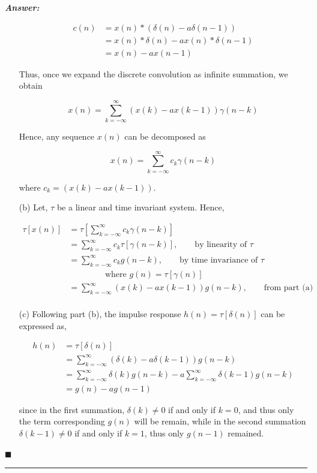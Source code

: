 \documentclass[12pt]{article}
\theoremstyle{definition}
\newenvironment{answer}{
    \textbf{\textit{Answer:}} \qquad
}{\hfill $\blacksquare$ \\ 

\begin{center}
    \rule{0.8\linewidth}{1.5px} 
    \vspace*{1cm}   
\end{center}
}
\begin{document}
\begin{answer}
\begin{enumerate}
        \begin{align*}
            c(n) 
            & = x(n) \ast (\delta(n) - a\delta(n-1))\\
            & = x(n) \ast \delta(n) - a x(n) \ast \delta(n-1)\\
            & = x(n) - ax(n-1)            
        \end{align*}

        Thus, once we expand the discrete convolution as infinite summation, we obtain

        $$
        x(n) = \sum_{k = -\infty}^\infty (x(k) - a x(k-1)) \gamma(n-k)
        $$

        Hence, any sequence $x(n)$ can be decomposed as
        
        $$
        x(n) = \sum_{k = -\infty}^\infty c_k \gamma(n-k)
        $$

        where $c_k = (x(k) - ax(k-1))$.

        \item[(b)] Let, $\tau$ be a linear and time invariant system. Hence,
        
        \begin{align*}
            \tau[x(n)]
            & = \tau\left[ \sum_{k = -\infty}^\infty c_k \gamma(n-k) \right]\\
            & = \sum_{k = -\infty}^\infty c_k \tau[\gamma(n-k)], \qquad \text{by linearity of }\tau\\
            & = \sum_{k = -\infty}^\infty c_k g(n-k), \qquad \text{by time invariance of } \tau\\
            & \qquad \qquad \text{ where } g(n) = \tau[\gamma(n)]\\
            & = \sum_{k = -\infty}^\infty (x(k) - ax(k-1)) g(n-k), \qquad \text{from part (a)}\\
        \end{align*}

        \item[(c)] Following part (b), the impulse response $h(n) = \tau[\delta(n)]$ can be expressed as,

        \begin{align*}
            h(n)
            & = \tau[\delta(n)]\\
            & = \sum_{k = -\infty}^\infty (\delta(k) - a\delta(k-1)) g(n-k)\\
            & = \sum_{k = -\infty}^\infty \delta(k) g(n-k) - a \sum_{k = -\infty}^\infty \delta(k-1)g(n-k)\\
            & = g(n) - a g(n-1)
        \end{align*}

        since in the first summation, $\delta(k) \neq 0$ if and only if $k = 0$, and thus only the term corresponding $g(n)$ will be remain, while in the second summation $\delta(k-1) \neq 0$ if and only if $k = 1$, thus only $g(n-1)$ remained.
    \end{enumerate}
\end{answer}
\end{document}
